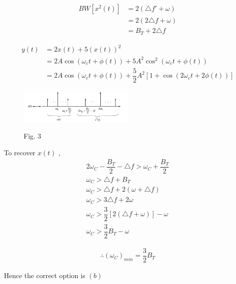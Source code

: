 \documentclass[journal,12pt,twocolumn]{IEEEtran}
\theoremstyle{remark}
\begin{document}
\begin{align}
BW[x^2(t)] &= 2(\triangle f' + \omega) \\
&=2(2\triangle f + \omega) \\
&=B_T + 2\triangle f
\end{align}

\begin{align}
y(t) &= 2x(t) + 5(x(t))^2 \\
&= 2A \cos(\omega_c t + \phi(t)) + 5A^{2} \cos^{2}(\omega_c t + \phi(t)) \\
&=  2A \cos(\omega_c t + \phi(t)) + \dfrac{5}{2}A^{2}[1 + \cos(2\omega_c t + 2\phi(t))]
\end{align}

\begin{figure}[h!]
  \centering
  \includegraphics[width=0.5\textwidth]{figures/cggatefig3.png} 
 \label{cggatefig3}
  \caption*{Fig. 3}
\end{figure}

To recover $x(t)$ ,
\begin{align}
2\omega_C - \dfrac{B_T}{2} - \triangle f > \omega_C + \dfrac{B_T}{2} \\
\omega_C > \triangle f + B_T \\
\omega_C > \triangle f + 2(\omega + \triangle f) \\
\omega_C > 3\triangle f + 2\omega \\
\omega_C > \dfrac{3}{2}[2(\triangle f + \omega)] - \omega \\
 \omega_C > \dfrac{3}{2}B_T - \omega
\end{align}

\begin{align}
\therefore (\omega_C)_{min} = \dfrac{3}{2}B_T
\end{align}

Hence the correct option is $(b)$
\end{document}

